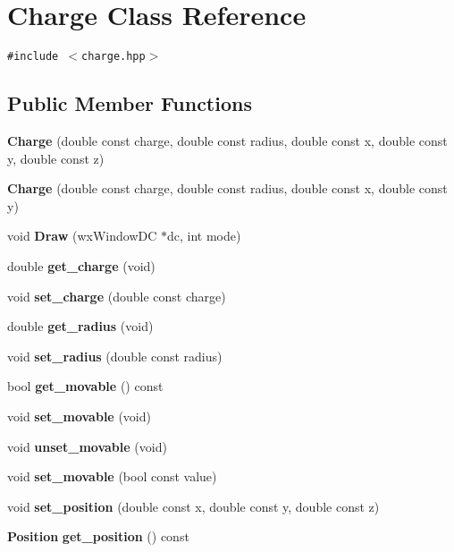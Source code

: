 \section{Charge Class Reference}
\label{classCharge}
{\tt \#include $<$charge.hpp$>$}

\subsection*{Public Member Functions}
\begin{CompactItemize}
\item 
{\bf Charge} (double const charge, double const radius, double const x, double const y, double const z)\label{classCharge_a1}

\item 
{\bf Charge} (double const charge, double const radius, double const x, double const y)\label{classCharge_a2}

\item 
void {\bf Draw} (wx\-Window\-DC $\ast$dc, int mode)
\item 
double {\bf get\_\-charge} (void)\label{classCharge_a4}

\item 
void {\bf set\_\-charge} (double const charge)\label{classCharge_a5}

\item 
double {\bf get\_\-radius} (void)\label{classCharge_a6}

\item 
void {\bf set\_\-radius} (double const radius)\label{classCharge_a7}

\item 
bool {\bf get\_\-movable} () const \label{classCharge_a8}

\item 
void {\bf set\_\-movable} (void)\label{classCharge_a9}

\item 
void {\bf unset\_\-movable} (void)\label{classCharge_a10}

\item 
void {\bf set\_\-movable} (bool const value)\label{classCharge_a11}

\item 
void {\bf set\_\-position} (double const x, double const y, double const z)\label{classCharge_a12}

\item 
{\bf Position} {\bf get\_\-position} () const \label{classCharge_a13}

\end{CompactItemize}


